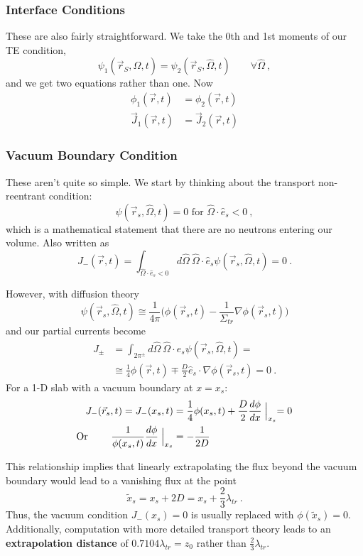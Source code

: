 \documentclass[12pt]{article}
\newcommand{\vOmega}{\ensuremath{\hat{\Omega}}}
\begin{document}
\subsubsection*{Interface Conditions}
These are also fairly straightforward. We take the 0th and 1st moments of our TE condition,
\[\psi_1(\vec{r}_S, \vOmega, t) = \psi_2(\vec{r}_S,\vOmega, t)\qquad \forall \vOmega\:,\]
and we get two equations rather than one. Now
\begin{align*}
\phi_1(\vec{r}, t) &= \phi_2(\vec{r}, t) \\
\vec{J}_1(\vec{r}, t) &= \vec{J}_2(\vec{r}, t)
\end{align*}

\subsubsection*{Vacuum Boundary Condition}
These aren't quite so simple. We start by thinking about the transport non-reentrant condition: 
\[\psi(\vec{r}_s, \vOmega, t) = 0 \text{ for } \vOmega \cdot \hat{e}_s < 0 \:,\]
%
which is a mathematical statement that there are no neutrons entering our volume. Also written as
\[J_{-}(\vec{r},t) = \int_{\vOmega \cdot \hat{e}_s < 0} d\vOmega \: \vOmega \cdot \hat{e}_s \psi(\vec{r}_s, \vOmega, t) = 0 \:.\]

However, with diffusion theory
\[\psi(\vec{r}_s, \vOmega, t) \cong \frac{1}{4\pi}\bigl(\phi(\vec{r}_s, t)  -\frac{1}{\Sigma_{tr}} \nabla \phi(\vec{r}_s, t)\bigr)\]
%
and our partial currents become
%
\begin{align*}
J_{\pm} &= \int_{2\pi^{\pm}} d\vOmega \: \vOmega \cdot \hat{e}_s \psi(\vec{r}_s, \vOmega, t) =\\
&\cong \frac{1}{4} \phi(\vec{r}, t) \mp \frac{D}{2} \hat{e}_s \cdot \nabla \phi(\vec{r}_s, t) = 0\:.
\end{align*} 
%
For a 1-D slab with a vacuum boundary at $x=x_s$:
%
\begin{align*}
J_{-}(\vec{r}_s, t) = J_{-}(x_s, t) &= \frac{1}{4} \phi(x_s, t) + \frac{D}{2}\frac{d \phi}{dx}\Bigm\lvert_{x_s} = 0 \\
\text{Or } \qquad \frac{1}{\phi(x_s, t)}\frac{d \phi}{dx}\Bigm\lvert_{x_s} &= -\frac{1}{2D}
\end{align*}

This relationship implies that linearly extrapolating the flux beyond the vacuum boundary would lead to a vanishing flux at the point
\[\tilde{x}_s = x_s + 2D = x_s + \frac{2}{3}\lambda_{tr}\:.\]
%
Thus, the vacuum condition $J_{-}(x_s) = 0$ is usually replaced with $\phi(\tilde{x}_s)= 0$. Additionally, computation with more detailed transport theory leads to an \textbf{extrapolation distance} of $0.7104\lambda_{tr} = z_0$ rather than $\frac{2}{3}\lambda_{tr}$. 
\end{document}
